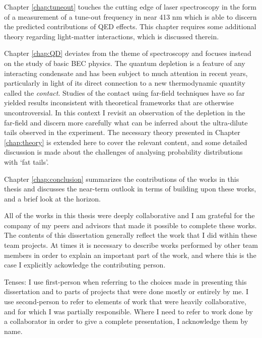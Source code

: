 	Chapter \ref{chap:tuneout} touches the cutting edge of laser spectroscopy in the form of a measurement of a tune-out frequency in \mhe near 413 nm which is able to discern the predicted contributions of QED effects. This chapter requires some additional theory regarding light-matter interactions, which is discussed therein.
	
	Chapter \ref{chap:QD} deviates from the theme of spectroscopy and focuses instead on the study of basic BEC physics. The quantum depletion is a feature of any interacting condensate and has been subject to much attention in recent years, particularly in light of its direct connection to a new thermodynamic quantity called the \emph{contact}. Studies of the contact using far-field techniques have so far yielded results inconsistent with theoretical frameworks that are otherwise uncontroversial. In this context I revisit an observation of the depletion in the far-field and discern more carefully what can be inferred about the ultra-dilute tails observed in the experiment. 
	The necessary theory presented in Chapter \ref{chap:theory} is extended here to cover the relevant content, and some detailed discussion is made about the challenges of analysing probability distributions with `fat tails'. 

	Chapter \ref{chap:conclusion} summarizes the contributions of the works in this thesis and discusses the near-term outlook in terms of building upon these works, and a brief look at the horizon.

	All of the works in this thesis were deeply collaborative and I am grateful for the company of my peers and advisors that made it possible to complete these works. The contents of this dissertation generally reflect the work that I did within these team projects. At times it is necessary to describe works performed by other team members in order to explain an important part of the work, and where this is the case I explicitly ackowledge the contributing person.

	Tenses: I use first-person when referring to the choices made in presenting this dissertation and to parts of projects that were done mostly or entirely by me. I use second-person to refer to elements of work that were heavily collaborative, and for which I was partially responsible. Where I need to refer to work done by a collaborator in order to give a complete presentation, I acknowledge them by name.

	






